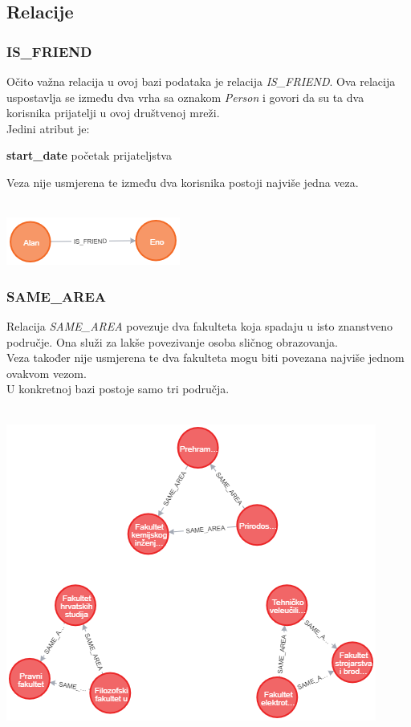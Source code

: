 \documentclass[titlepage, 12pt]{scrartcl}
\begin{document}
\subsection{Relacije}
\subsubsection{IS\_FRIEND}
Očito važna relacija u ovoj bazi podataka je relacija \emph{IS\_FRIEND}. Ova relacija uspostavlja se između dva vrha sa oznakom \emph{Person} i govori da su ta dva korisnika prijatelji u ovoj društvenoj mreži. \\
Jedini atribut je:
\begin{itemize}
\begin{samepage}
    \item \textbf{start\_date} početak prijateljstva
\end{samepage}
\end{itemize}
Veza nije usmjerena te između dva korisnika postoji najviše jedna veza. \\ \\
\begin{center}
    \includegraphics{slike/IS_FRIEND.png}
\end{center}

\subsubsection{SAME\_AREA}
Relacija \emph{SAME\_AREA} povezuje dva fakulteta koja spadaju u isto znanstveno područje. Ona služi za lakše povezivanje osoba sličnog obrazovanja. \\
Veza također nije usmjerena te dva fakulteta mogu biti povezana najviše jednom ovakvom vezom. \\
U konkretnoj bazi postoje samo tri područja.
\\ \\
\begin{center}
    \includegraphics[scale=0.7]{slike/SAME_AREA.png}\label{fig:SAME_AREA}    
\end{center}
\end{document}
